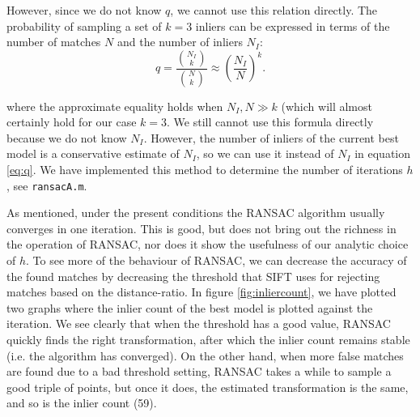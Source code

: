 \documentclass[a4paper,10pt]{article}
\begin{document}
However, since we do not know $q$, we cannot use this relation directly.
The probability of sampling a set of $k=3$ inliers can be expressed in terms of the number of matches $N$ and the number of inliers $N_I$:
\begin{equation}
q = \frac{\binom{N_I}{k}}{\binom{N}{k}} \approx \left(\frac{N_I}{N}\right)^k.
\label{eq:q}
\end{equation}

where the approximate equality holds when $N_I,N \gg k$ (which will almost certainly hold for our case $k=3$.
We still cannot use this formula directly because we do not know $N_I$.
However, the number of inliers of the current best model is a conservative estimate of $N_I$, so we can use it instead of $N_I$ in equation \ref{eq:q}.
We have implemented this method to determine the number of iterations $h$, see \verb+ransacA.m+.

As mentioned, under the present conditions the RANSAC algorithm usually converges in one iteration.
This is good, but does not bring out the richness in the operation of RANSAC, nor does it show the usefulness of our analytic choice of $h$.
To see more of the behaviour of RANSAC, we can decrease the accuracy of the found matches by decreasing the threshold that SIFT uses for rejecting matches based on the distance-ratio.
In figure \ref{fig:inliercount}, we have plotted two graphs where the inlier count of the best model is plotted against the iteration.
We see clearly that when the threshold has a good value, RANSAC quickly finds the right transformation, after which the inlier count remains stable (i.e. the algorithm has converged).
On the other hand, when more false matches are found due to a bad threshold setting, RANSAC takes a while to sample a good triple of points, but once it does, the estimated transformation is the same, and so is the inlier count (59).
\end{document}
